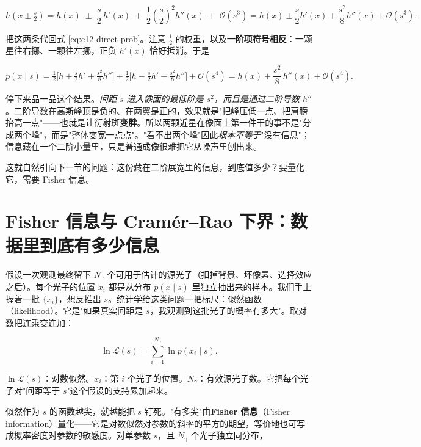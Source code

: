 \[
  h\!\left(x\pm\tfrac{s}{2}\right)
  =h(x)\;\pm\;\frac{s}{2}\,h'(x)
   \;+\;\frac{1}{2}\left(\frac{s}{2}\right)^{2}h''(x)
   \;+\;\mathcal{O}(s^{3})
  =h(x)\pm\frac{s}{2}h'(x)+\frac{s^{2}}{8}h''(x)+\mathcal{O}(s^{3}).
\]

把这两条代回式 \eqref{eq:e12-direct-prob}。注意 \(\tfrac12\) 的权重，以及\textbf{一阶项符号相反}：一颗星往右挪、一颗往左挪，正负 \(h'(x)\) 恰好抵消。于是

\[
  p(x\mid s)
  =\tfrac12\Big[h+\tfrac{s}{2}h'+\tfrac{s^{2}}{8}h''\Big]
  +\tfrac12\Big[h-\tfrac{s}{2}h'+\tfrac{s^{2}}{8}h''\Big]
  +\mathcal{O}(s^{4})
  =h(x)+\frac{s^{2}}{8}\,h''(x)+\mathcal{O}(s^{4}).
\]

停下来品一品这个结果。\emph{间距 \(s\) 进入像面的最低阶是 \(s^2\)，而且是通过二阶导数 \(h''\)}。二阶导数在高斯峰顶是负的、在两翼是正的，效果就是"把峰压低一点、把肩膀抬高一点"——也就是让衍射斑\textbf{变胖}。所以两颗近星在像面上第一件干的事不是"分成两个峰"，而是"整体变宽一点点"。"看不出两个峰"因此\emph{根本不等于}"没有信息"；信息藏在一个二阶小量里，只是普通成像很难把它从噪声里刨出来。

这就自然引向下一节的问题：这份藏在二阶展宽里的信息，到底值多少？要量化它，需要 Fisher 信息。


\section{Fisher 信息与 Cramér--Rao 下界：数据里到底有多少信息}
\label{sec:e12-fisher}

假设一次观测最终留下 \(N_\gamma\) 个可用于估计的源光子（扣掉背景、坏像素、选择效应之后）。每个光子的位置 \(x_i\) 都是从分布 \(p(x\mid s)\) 里独立抽出来的样本。我们手上握着一批 \(\{x_i\}\)，想反推出 \(s\)。统计学给这类问题一把标尺：似然函数（likelihood）。它是"如果真实间距是 \(s\)，我观测到这批光子的概率有多大"。取对数把连乘变连加：

\begin{equation}
  \ln\mathcal{L}(s)=\sum_{i=1}^{N_\gamma}\ln p(x_i\mid s).
  \label{eq:e12-loglike}
\end{equation}
\begin{formulaexplain}
\(\ln\mathcal{L}(s)\)：对数似然。\(x_i\)：第 \(i\) 个光子的位置。\(N_\gamma\)：有效源光子数。它把每个光子对"间距等于 \(s\)"这个假设的支持累加起来。
\end{formulaexplain}

似然作为 \(s\) 的函数越尖，就越能把 \(s\) 钉死。"有多尖"由\textbf{Fisher 信息}（Fisher information）量化——它是对数似然对参数的斜率的平方的期望，等价地也可写成概率密度对参数的敏感度。对单参数 \(s\)，且 \(N_\gamma\) 个光子独立同分布，


